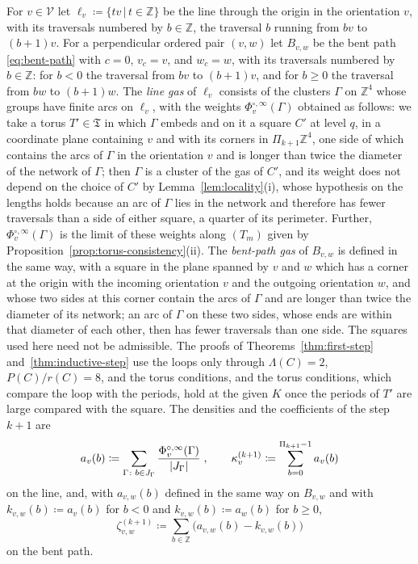 \documentclass[11pt]{preprint}
\DeclarePairedDelimiter{\abs}{\lvert}{\rvert}
\numberwithin{equation}{section}
\theoremstyle{definition}
\theoremstyle{remark}
\theoremstyle{plain}
\begin{document}
For $v \in \mathcal V$ let $\ell_v \coloneqq \{ tv \, | \, t \in \mathbb Z \}$ be the line through the origin in the orientation $v$, with its traversals numbered by $b \in \mathbb Z$, the traversal $b$ running from $bv$ to $(b + 1)v$. For a perpendicular ordered pair $(v, w)$ let $B_{v,w}$ be the bent path \eqref{eq:bent-path} with $c = 0$, $v_c = v$, and $w_c = w$, with its traversals numbered by $b \in \mathbb Z$: for $b < 0$ the traversal from $bv$ to $(b + 1)v$, and for $b \geq 0$ the traversal from $bw$ to $(b + 1)w$. The \emph{line gas} of $\ell_v$ consists of the clusters $\Gamma$ on $\mathbb Z^4$ whose groups have finite arcs on $\ell_v$, with the weights $\Phi^{\circ,\infty}_v(\Gamma)$ obtained as follows: we take a torus $T' \in \mathfrak T$ in which $\Gamma$ embeds and on it a square $C'$ at level $q$, in a coordinate plane containing $v$ and with its corners in $\Pi_{k+1}\mathbb Z^4$, one side of which contains the arcs of $\Gamma$ in the orientation $v$ and is longer than twice the diameter of the network of $\Gamma$; then $\Gamma$ is a cluster of the gas of $C'$, and its weight does not depend on the choice of $C'$ by Lemma~\ref{lem:locality}(i), whose hypothesis on the lengths holds because an arc of $\Gamma$ lies in the network and therefore has fewer traversals than a side of either square, a quarter of its perimeter. Further, $\Phi^{\circ,\infty}_v(\Gamma)$ is the limit of these weights along $(T_m)$ given by Proposition~\ref{prop:torus-consistency}(ii). The \emph{bent-path gas} of $B_{v,w}$ is defined in the same way, with a square in the plane spanned by $v$ and $w$ which has a corner at the origin with the incoming orientation $v$ and the outgoing orientation $w$, and whose two sides at this corner contain the arcs of $\Gamma$ and are longer than twice the diameter of its network; an arc of $\Gamma$ on these two sides, whose ends are within that diameter of each other, then has fewer traversals than one side. The squares used here need not be admissible. The proofs of Theorems~\ref{thm:first-step} and~\ref{thm:inductive-step} use the loops only through $\Lambda(C) = 2$, $P(C)/r(C) = 8$, and the torus conditions, and the torus conditions, which compare the loop with the periods, hold at the given $K$ once the periods of $T'$ are large compared with the square. The densities and the coefficients of the step $k + 1$ are
\begin{equation}\label{eq:line-coefficient}
    a_v(b) \coloneqq \sum_{\Gamma\colon b \in J_\Gamma}\frac{\Phi^{\circ,\infty}_v(\Gamma)}{\abs{J_\Gamma}}\;,
    \qquad
    \kappa^{(k+1)}_v \coloneqq \sum_{b=0}^{\Pi_{k+1}-1}a_v(b)
\end{equation}
on the line, and, with $a_{v,w}(b)$ defined in the same way on $B_{v,w}$ and with $k_{v,w}(b) \coloneqq a_v(b)$ for $b < 0$ and $k_{v,w}(b) \coloneqq a_w(b)$ for $b \geq 0$,
\begin{equation}\label{eq:corner-coefficient}
    \zeta^{(k+1)}_{v,w} \coloneqq \sum_{b \in \mathbb Z}\bigl(a_{v,w}(b) - k_{v,w}(b)\bigr)
\end{equation}
on the bent path.
\end{document}

